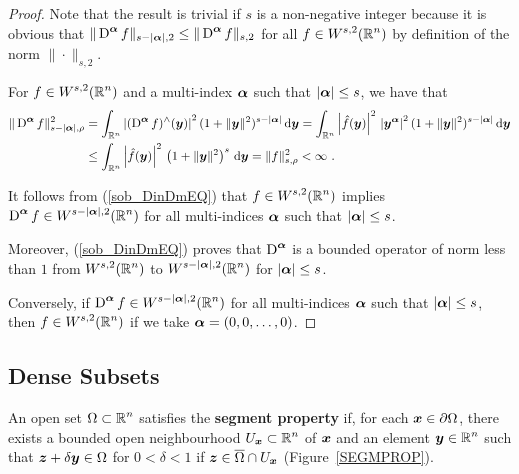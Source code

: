 \begin{proof}
Note that the result is trivial if $s$ is a non-negative integer
because it is obvious that
$\displaystyle \|\operatorname{D}^{{\bm{\alpha}}} f\|_{s-|{\bm{\alpha}}|,2} \leq
\|\operatorname{D}^{{\bm{\alpha}}} f\|_{s,2}$ for all $\displaystyle f \in W^{s,2}(\mathbb{R}^n)$
by definition of the norm $\|\cdot\|_{s,2}$.

For $\displaystyle f \in W^{s,2}(\mathbb{R}^n)$ and a multi-index ${\bm{\alpha}}$
such that $|{\bm{\alpha}}| \leq s$, we have that
\begin{align}
\|\operatorname{D}^{{\bm{\alpha}}} f\|_{s-|{\bm{\alpha}}|,\rho}^2 &= \int_{\mathbb{R}^n}
\left| (\operatorname{D}^{{\bm{\alpha}}} f)^\wedge({\bm{y}}) \right|^2
(1+\|{\bm{y}}\|^2)^{s-|{\bm{\alpha}}|} \,\mathrm{d}{{\bm{y}}}
= \int_{\mathbb{R}^n}
\left|\hat{f}({\bm{y}}) \right|^2 \, \left| {\bm{y}}^{{\bm{\alpha}}} \right|^2
(1+\|{\bm{y}}\|^2)^{s-|{\bm{\alpha}}|} \,\mathrm{d}{{\bm{y}}} \nonumber \\
&\leq \int_{\mathbb{R}^n} \left|\hat{f}({\bm{y}}) \right|^2 \,
\left( 1 + \|{\bm{y}}\|^2\right)^s \,\mathrm{d}{{\bm{y}}} = \|f\|_{s,\rho}^2
< \infty \ . \label{sob_DinDmEQ}
\end{align}

It follows from (\ref{sob_DinDmEQ}) that
$\displaystyle f\in W^{s,2}(\mathbb{R}^n)$ implies
$\displaystyle \operatorname{D}^{{\bm{\alpha}}} f \in W^{s-|{\bm{\alpha}}|,2}(\mathbb{R}^n)$
for all multi-indices ${\bm{\alpha}}$ such that $|{\bm{\alpha}}|\leq s$.

Moreover, (\ref{sob_DinDmEQ}) proves that
$\displaystyle \operatorname{D}^{{\bm{\alpha}}}$ is a bounded operator
of norm less than $1$ from $\displaystyle W^{s,2}(\mathbb{R}^n)$ to
$\displaystyle W^{s-|{\bm{\alpha}}|,2}(\mathbb{R}^n)$ for $|{\bm{\alpha}}|\leq s$.

Conversely, if $\displaystyle \operatorname{D}^{{\bm{\alpha}}} f \in
W^{s-|{\bm{\alpha}}|,2}(\mathbb{R}^n)$ for
all multi-indices ${\bm{\alpha}}$ such that $|{\bm{\alpha}}|\leq s$, then
$\displaystyle f\in W^{s,2}(\mathbb{R}^n)$ if we take ${\bm{\alpha}} = (0,0,\ldots,0)$.
\end{proof}

\subsection{Dense Subsets}

\begin{defn}
An open set $\displaystyle \Omega \subset \mathbb{R}^n$ satisfies
the {\bfseries segment property} if, for each
${\bm{x}} \in \partial \Omega$,
there exists a bounded open neighbourhood
$\displaystyle U_{{\bm{x}}} \subset \mathbb{R}^n$ of ${\bm{x}}$ and an
element $\displaystyle {\bm{y}} \in \mathbb{R}^n$ such that
${\bm{z}} + \delta {\bm{y}} \in \Omega$ for $0<\delta < 1$ if
${\bm{z}} \in \overline{\Omega} \cap U_{{\bm{x}}}$ (Figure~\ref{SEGMPROP}).
\end{defn}


